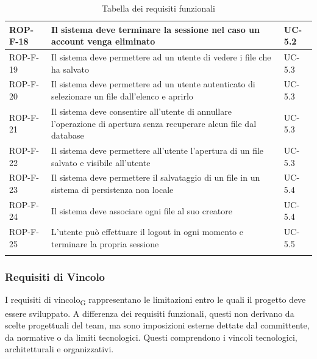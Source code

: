 \documentclass[11pt,a4paper]{article}
\begin{document}
\begin{longtable}{|p{}|>{\raggedright\arraybackslash}p{}|p{}|}
\hline
ROP-F-18 & Il sistema deve terminare la sessione nel caso un account venga eliminato & UC-5.2 \\
\hline
ROP-F-19 & Il sistema deve permettere ad un utente di vedere i file che ha salvato & UC-5.3 \\
\hline
ROP-F-20 & Il sistema deve permettere ad un utente autenticato di selezionare un file dall'elenco e aprirlo & UC-5.3 \\
\hline
ROP-F-21 & Il sistema deve consentire all'utente di annullare l'operazione di apertura senza recuperare alcun file dal database & UC-5.3 \\
\hline
ROP-F-22 & Il sistema deve permettere all'utente l'apertura di un file salvato e visibile all'utente & UC-5.3 \\
\hline
ROP-F-23 & Il sistema deve permettere il salvataggio di un file in un sistema di persistenza non locale & UC-5.4 \\
\hline
ROP-F-24 & Il sistema deve associare ogni file al suo creatore & UC-5.4 \\
\hline
ROP-F-25 & L'utente può effettuare il logout in ogni momento e terminare la propria sessione & UC-5.5 \\
\hline

\addlinespace[1em]
\caption{Tabella dei requisiti funzionali}
\end{longtable}

\newpage
\subsubsection{Requisiti di Vincolo}
I requisiti di vincolo\textsubscript{G} rappresentano le limitazioni entro le quali il progetto deve essere sviluppato. A differenza dei requisiti funzionali, questi non derivano da scelte progettuali del team, ma sono imposizioni esterne dettate dal committente, da normative o da limiti tecnologici.
Questi comprendono i vincoli tecnologici, architetturali e organizzativi.
\end{document}
